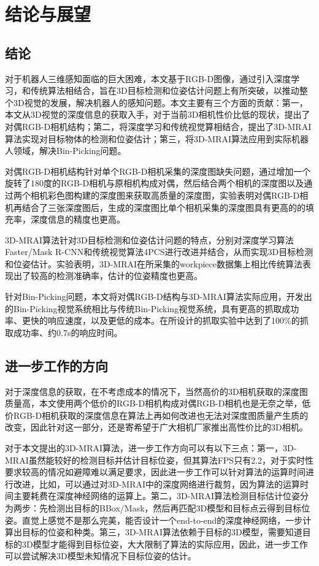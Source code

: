 \chapter{结论与展望}
\label{conclusion}
\section{结论}
对于机器人三维感知面临的巨大困难，本文基于RGB-D图像，通过引入深度学习，和传统算法相结合，旨在3D目标检测和位姿估计问题上有所突破，以推动整个3D视觉的发展，解决机器人的感知问题。本文主要有三个方面的贡献：第一，本文从3D视觉的深度信息的获取入手，对于当前3D相机性价比低的现状，提出了对偶RGB-D相机结构；第二，将深度学习和传统视觉算相结合，提出了3D-MRAI算法实现对目标物体的检测和位姿估计；第三，将3D-MRAI算法应用到实际机器人领域，解决Bin-Picking问题。

对偶RGB-D相机结构针对单个RGB-D相机采集的深度图缺失问题，通过增加一个旋转了180度的RGB-D相机与原相机构成对偶，然后结合两个相机的深度图以及通过两个相机彩色图构建的深度图来获取高质量的深度图，实验表明对偶RGB-D相机再结合了三张深度图后，生成的深度图比单个相机采集的深度图具有更高的的填充率，深度信息的精度也更高。

3D-MRAI算法针对3D目标检测和位姿估计问题的特点，分别对深度学习算法Faster/Mask R-CNN和传统视觉算法4PCS进行改进并结合，从而实现3D目标检测和位姿估计。实验表明，3D-MRAI在所采集的workpiece数据集上相比传统算法表现出了较高的检测准确率，估计的位姿精度也更高。

针对Bin-Picking问题，本文将对偶RGB-D结构与3D-MRAI算法实际应用，开发出的Bin-Picking视觉系统相比与传统Bin-Picking视觉系统，具有更高的抓取成功率、更快的响应速度，以及更低的成本。在所设计的抓取实验中达到了100\%的抓取成功率、约0.7s的响应时间。

\section{进一步工作的方向}
对于深度信息的获取，在不考虑成本的情况下，当然高价的3D相机获取的深度图质量高，本文使用两个低价的RGB-D相机构成对偶RGB-D相机也是无奈之举，低价RGB-D相机获取的深度信息在算法上再如何改进也无法对深度图质量产生质的改变，因此针对这一部分，还是寄希望于广大相机厂家推出高性价比的3D相机。

对于本文提出的3D-MRAI算法，进一步工作方向可以有以下三点：第一，3D-MRAI虽然能较好的检测目标并估计目标位姿，但其算法FPS只有2.2，对于实时性要求较高的情况如避障难以满足要求，因此进一步工作可以针对算法的运算时间进行改进，比如，可以通过对3D-MRAI中的深度网络进行裁剪，因为算法的运算时间主要耗费在深度神经网络的运算上。第二，3D-MRAI算法检测目标估计位姿分为两步：先检测出目标的BBox/Mask，然后再匹配3D模型和目标点云得到目标位姿。直觉上感觉不是那么完美，能否设计一个end-to-end的深度神经网络，一步计算出目标的位姿和种类。第三，3D-MRAI算法依赖于目标的3D模型，需要知道目标的3D模型才能得到目标位姿，大大限制了算法的实际应用，因此，进一步工作可以尝试解决3D模型未知情况下目标位姿的估计。

